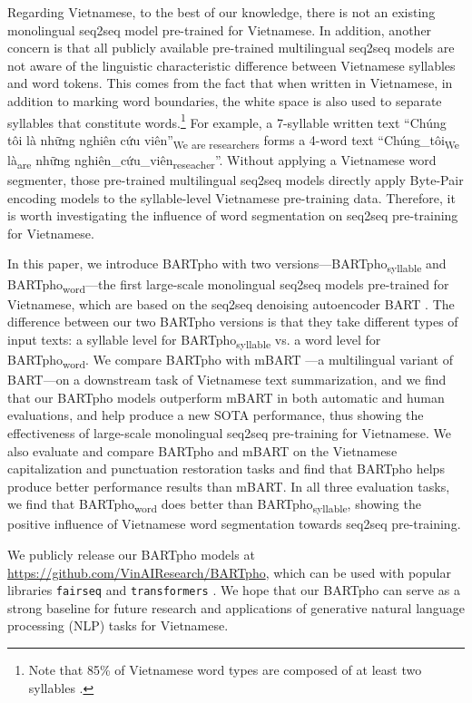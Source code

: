 \documentclass[a4paper]{article}
\begin{document}
Regarding Vietnamese, to the best of our knowledge, there is not an existing monolingual seq2seq model pre-trained for Vietnamese. In addition, another concern is that all publicly available pre-trained multilingual seq2seq models are not aware of the linguistic characteristic difference between Vietnamese syllables and word tokens.  
This comes from the fact that when written in Vietnamese, in addition to marking word boundaries, the white space is also used to separate syllables that constitute words.\footnote{Note that 85\% of Vietnamese word types are composed of at least two syllables \cite{DinhQuangThang2008}.} For example, a 7-syllable written text ``Chúng tôi là những nghiên cứu viên''\textsubscript{We are researchers} forms a 4-word text ``Chúng\_tôi\textsubscript{We} là\textsubscript{are} những nghiên\_cứu\_viên\textsubscript{reseacher}''.  Without applying a Vietnamese word segmenter, those pre-trained multilingual seq2seq models directly apply Byte-Pair encoding models \cite{sennrich-etal-2016-neural,kudo-richardson-2018-sentencepiece} to the syllable-level Vietnamese pre-training data. 
Therefore, it is worth investigating the influence of word segmentation on seq2seq pre-training for Vietnamese. 

In this paper, we introduce BARTpho with two versions---BARTpho\textsubscript{syllable} and BARTpho\textsubscript{word}---the first large-scale monolingual seq2seq models pre-trained for Vietnamese, which are based on the seq2seq denoising autoencoder BART \cite{lewis-etal-2020-bart}. 
The difference between our two BARTpho versions is that they take different types of input texts: a syllable level for BARTpho\textsubscript{syllable} vs. a word level for BARTpho\textsubscript{word}. We compare BARTpho with mBART \cite{tacl_a_00343}---a multilingual variant of BART---on a downstream task of Vietnamese text summarization, and we find that our BARTpho models outperform mBART in both automatic and human evaluations, and help produce a new SOTA performance, thus showing the effectiveness of large-scale monolingual seq2seq pre-training for Vietnamese. We also evaluate and compare BARTpho and mBART on the Vietnamese capitalization and punctuation restoration tasks and find that BARTpho helps produce better performance results than mBART. In all three evaluation tasks, we find that BARTpho\textsubscript{word} does better than BARTpho\textsubscript{syllable}, showing the positive influence of Vietnamese word segmentation towards seq2seq pre-training. 

We publicly release our BARTpho models at \url{https://github.com/VinAIResearch/BARTpho},  which can be used with popular libraries  \texttt{fairseq}  \cite{ott2019fairseq} and  \texttt{transformers} \cite{wolf-etal-2020-transformers}. We hope that our BARTpho can serve as a strong baseline for future research and applications of generative natural language processing (NLP) tasks for Vietnamese.
\end{document}
